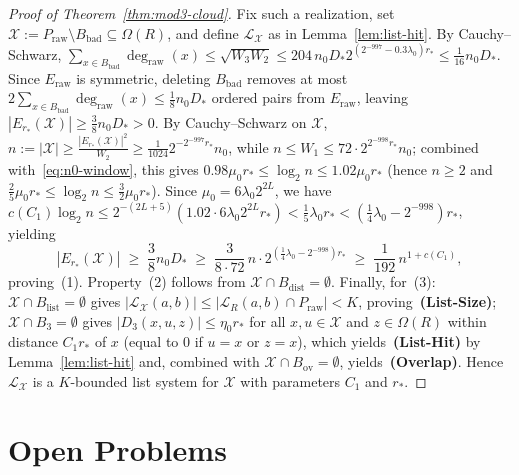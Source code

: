 \documentclass[11pt]{article}
\theoremstyle{definition}
\theoremstyle{remark}
\begin{document}
\begin{proof}[Proof of Theorem~\ref{thm:mod3-cloud}]
Fix such a realization, set $\mathcal{X} := P_{\mathrm{raw}} \setminus B_{\mathrm{bad}} \subseteq \Omega(R)$, and define $\mathcal{L}_{\mathcal{X}}$ as in Lemma~\ref{lem:list-hit}. By Cauchy--Schwarz, $\sum_{x \in B_{\mathrm{bad}}} \deg_{\mathrm{raw}}(x) \le \sqrt{W_3 W_2} \le 204\,n_0 D_* 2^{(2^{-997} - 0.3\lambda_0) r_*} \le \frac{1}{16} n_0 D_*$. Since $E_{\mathrm{raw}}$ is symmetric, deleting $B_{\mathrm{bad}}$ removes at most $2\sum_{x \in B_{\mathrm{bad}}} \deg_{\mathrm{raw}}(x) \le \frac{1}{8} n_0 D_*$ ordered pairs from $E_{\mathrm{raw}}$, leaving $|E_{r_*}(\mathcal{X})| \ge \frac{3}{8} n_0 D_* > 0$. By Cauchy--Schwarz on $\mathcal{X}$, $n := |\mathcal{X}| \ge \frac{|E_{r_*}(\mathcal{X})|^2}{W_2} \ge \frac{1}{1024} 2^{-2^{-997} r_*} n_0$, while $n \le W_1 \le 72 \cdot 2^{2^{-998} r_*} n_0$; combined with~\eqref{eq:n0-window}, this gives $0.98 \mu_0 r_* \le \log_2 n \le 1.02 \mu_0 r_*$ (hence $n \ge 2$ and $\frac{2}{5}\mu_0 r_* \le \log_2 n \le \frac{3}{2}\mu_0 r_*$). Since $\mu_0 = 6\lambda_0 2^{2 L}$, we have $c(C_1)\log_2 n \le 2^{-(2L + 5)}(1.02 \cdot 6 \lambda_0 2^{2L} r_*) < \frac{1}{5}\lambda_0 r_* < (\frac{1}{4}\lambda_0 - 2^{-998}) r_*$, yielding
\[
|E_{r_*}(\mathcal{X})| \;\ge\; \frac{3}{8} n_0 D_* \;\ge\; \frac{3}{8 \cdot 72}\,n \cdot 2^{(\frac{1}{4}\lambda_0 - 2^{-998}) r_*} \;\ge\; \frac{1}{192}\,n^{1 + c(C_1)},
\]
proving~(1). Property~(2) follows from $\mathcal{X} \cap B_{\mathrm{dist}} = \emptyset$. Finally, for~(3): $\mathcal{X} \cap B_{\mathrm{list}} = \emptyset$ gives $|\mathcal{L}_{\mathcal{X}}(a, b)| \le |\mathcal{L}_R(a, b) \cap P_{\mathrm{raw}}| < K$, proving~\textbf{(List-Size)}; $\mathcal{X} \cap B_3 = \emptyset$ gives $|D_3(x, u, z)| \le \eta_0 r_*$ for all $x, u \in \mathcal{X}$ and $z \in \Omega(R)$ within distance $C_1 r_*$ of $x$ (equal to $0$ if $u = x$ or $z = x$), which yields~\textbf{(List-Hit)} by Lemma~\ref{lem:list-hit} and, combined with $\mathcal{X} \cap B_{\mathrm{ov}} = \emptyset$, yields~\textbf{(Overlap)}. Hence $\mathcal{L}_{\mathcal{X}}$ is a $K$-bounded list system for $\mathcal{X}$ with parameters $C_1$ and $r_*$.
\end{proof}


\section{Open Problems}
\label{sec:open}
\end{document}
